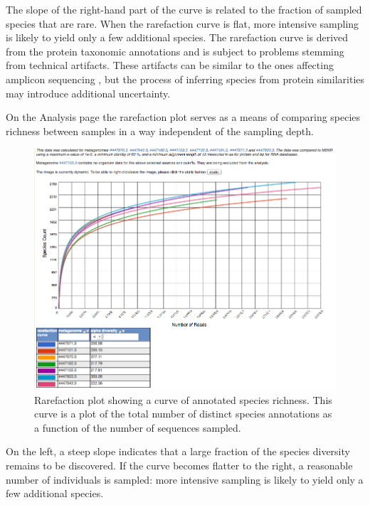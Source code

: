 \documentclass[12pt,fullpage]{report}
\begin{document}
The slope of the right-hand part of the curve is related to the fraction of sampled species that are rare. When the rarefaction curve is flat, more intensive sampling is likely to yield only a few additional species. The rarefaction curve is derived from the protein taxonomic annotations and is subject to problems stemming from technical artifacts. These artifacts can be similar to the ones affecting amplicon sequencing \cite{RARE}, but the process of inferring species from protein similarities may introduce additional uncertainty.

On the Analysis page the rarefaction plot serves as a means of comparing species richness between samples in a way independent of the sampling depth.

\begin{figure}
\begin{center}
\includegraphics[width=6in]{Images/analysis-page-rarefaction-example.png}
\end{center}
\caption{
Rarefaction plot showing a curve of annotated species richness. This curve is a plot of the total number of distinct species annotations as a function of the number of sequences sampled.
}
\label{fig:analysis-page-rarefaction-example.png}
\end{figure}

On the left, a steep slope indicates that a large fraction of the species diversity remains to be discovered. If the curve becomes flatter to the right, a reasonable number of individuals is sampled: more intensive sampling is likely to yield only a few additional species.
\end{document}
